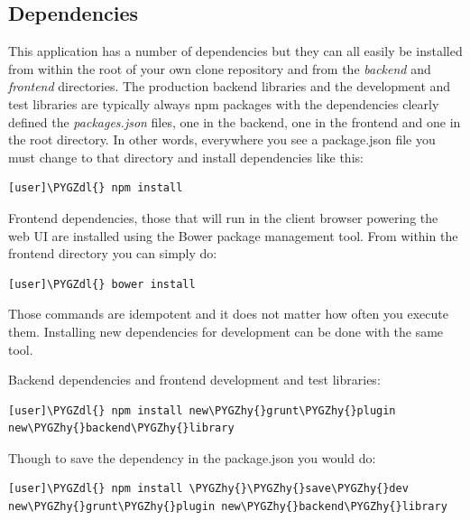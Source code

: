 \documentclass[letterpaper,10pt,english]{sphinxmanual}
\def\PYGZdl{\char`\$}
\def\PYGZhy{\char`\-}
\begin{document}
\subsection{Dependencies}
\label{developer-guide:dependencies}
This application has a number of dependencies but they can all easily
be installed from within the root of your own clone repository and
from the \emph{backend} and \emph{frontend} directories. The production backend
libraries and the development and test libraries are typically always
npm packages with the dependencies clearly defined the \emph{packages.json}
files, one in the backend, one in the frontend and one in the root
directory. In other words, everywhere you see a package.json file you
must change to that directory and install dependencies like this:

\begin{Verbatim}[commandchars=\\\{\}]
[user]\PYGZdl{} npm install
\end{Verbatim}

Frontend dependencies, those that will run in the client browser
powering the web UI are installed using the Bower package management
tool. From within the frontend directory you can simply do:

\begin{Verbatim}[commandchars=\\\{\}]
[user]\PYGZdl{} bower install
\end{Verbatim}

Those commands are idempotent and it does not matter how often you
execute them. Installing new dependencies for development can be done
with the same tool.

Backend dependencies and frontend development and test libraries:

\begin{Verbatim}[commandchars=\\\{\}]
[user]\PYGZdl{} npm install new\PYGZhy{}grunt\PYGZhy{}plugin new\PYGZhy{}backend\PYGZhy{}library
\end{Verbatim}

Though to save the dependency in the package.json you would do:

\begin{Verbatim}[commandchars=\\\{\}]
[user]\PYGZdl{} npm install \PYGZhy{}\PYGZhy{}save\PYGZhy{}dev new\PYGZhy{}grunt\PYGZhy{}plugin new\PYGZhy{}backend\PYGZhy{}library
\end{Verbatim}
\end{document}
